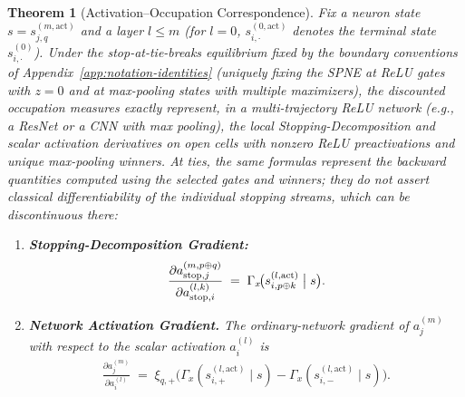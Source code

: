 \documentclass[twoside]{article}
\newcommand{\1}{\mathbf{1}}
\newtheorem{theorem}{Theorem}
\begin{document}
\begin{theorem}[Activation--Occupation Correspondence]\label{thm:deriv-occ}
Fix a neuron state $s = s_{j,q}^{(m, \mathrm{act})}$ and a layer $l \le m$ (for $l = 0$,
$s_{i,\cdot}^{(0,\mathrm{act})}$ denotes the terminal state $s_{i,\cdot}^{(0)}$). Under the
stop-at-tie-breaks equilibrium fixed by the boundary conventions of
Appendix~\ref{app:notation-identities} (uniquely fixing the SPNE at ReLU gates with $z = 0$ and at
max-pooling states with multiple maximizers), the discounted occupation measures exactly represent,
in a multi-trajectory ReLU network (e.g., a ResNet or a CNN with max pooling), the local
Stopping-Decomposition and scalar activation derivatives on open cells with nonzero ReLU preactivations and unique max-pooling winners. At ties, the same formulas represent the backward quantities computed using the selected gates and winners; they do not assert classical differentiability of the individual stopping streams, which can be discontinuous there:
\begin{enumerate}
    \item \textbf{Stopping-Decomposition Gradient:}
        \begin{align}
            \frac{\partial a_{\mathrm{stop},j}^{(m, p \oplus q)}}{\partial a_{\mathrm{stop},i}^{(l, k)}}
            \;=\;
            \Gamma_x\!\bigl(s_{i, p \oplus k}^{(l, \mathrm{act})} \bigm| s\bigr).
        \end{align}
    \item \textbf{Network Activation Gradient.} The ordinary-network gradient of $a_j^{(m)}$ with respect to
        the scalar activation $a_i^{(l)}$ is
        \begin{align}
            \frac{\partial a_j^{(m)}}{\partial a_i^{(l)}}
            \;=\;
            \xi_{q, +}\bigl(\Gamma_x(s_{i, +}^{(l, \mathrm{act})} \mid s) - \Gamma_x(s_{i, -}^{(l,
            \mathrm{act})} \mid s)\bigr).
        \end{align}
\end{enumerate}
\end{theorem}
\end{document}
